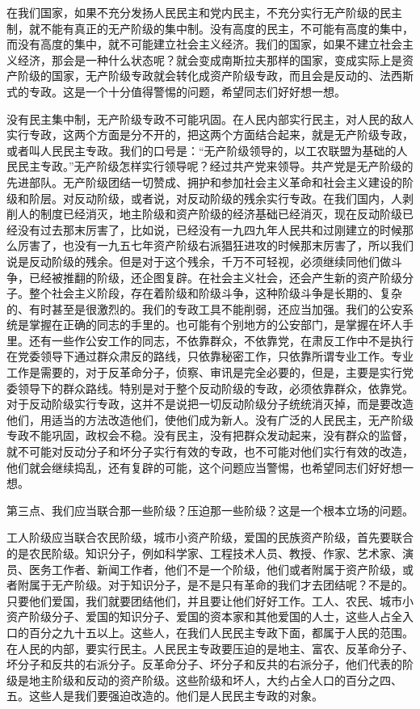 在我们国家，如果不充分发扬人民民主和党内民主，不充分实行无产阶级的民主制，就不能有真正的无产阶级的集中制。没有高度的民主，不可能有高度的集中，而没有高度的集中，就不可能建立社会主义经济。我们的国家，如果不建立社会主义经济，那会是一种什么状态呢？就会变成南斯拉夫那样的国家，变成实际上是资产阶级的国家，无产阶级专政就会转化成资产阶级专政，而且会是反动的、法西斯式的专政。这是一个十分值得警惕的问题，希望同志们好好想一想。

没有民主集中制，无产阶级专政不可能巩固。在人民内部实行民主，对人民的敌人实行专政，这两个方面是分不开的，把这两个方面结合起来，就是无产阶级专政，或者叫人民民主专政。我们的口号是：“无产阶级领导的，以工农联盟为基础的人民民主专政。”无产阶级怎样实行领导呢？经过共产党来领导。共产党是无产阶级的先进部队。无产阶级团结一切赞成、拥护和参加社会主义革命和社会主义建设的阶级和阶层。对反动阶级，或者说，对反动阶级的残余实行专政。在我们国内，人剥削人的制度已经消灭，地主阶级和资产阶级的经济基础已经消灭，现在反动阶级已经没有过去那末厉害了，比如说，已经没有一九四九年人民共和过刚建立的时候那么厉害了，也没有一九五七年资产阶级右派猖狂进攻的时候那末厉害了，所以我们说是反动阶级的残余。但是对于这个残余，千万不可轻视，必须继续同他们做斗争，已经被推翻的阶级，还企图复辟。在社会主义社会，还会产生新的资产阶级分子。整个社会主义阶段，存在着阶级和阶级斗争，这种阶级斗争是长期的、复杂的、有时甚至是很激烈的。我们的专政工具不能削弱，还应当加强。我们的公安系统是掌握在正确的同志的手里的。也可能有个别地方的公安部门，是掌握在坏人手里。还有一些作公安工作的同志，不依靠群众，不依靠党，在肃反工作中不是执行在党委领导下通过群众肃反的路线，只依靠秘密工作，只依靠所谓专业工作。专业工作是需要的，对于反革命分子，侦察、审讯是完全必要的，但是，主要是实行党委领导下的群众路线。特别是对于整个反动阶级的专政，必须依靠群众，依靠党。对于反动阶级实行专政，这并不是说把一切反动阶级分子统统消灭掉，而是要改造他们，用适当的方法改造他们，使他们成为新人。没有广泛的人民民主，无产阶级专政不能巩固，政权会不稳。没有民主，没有把群众发动起来，没有群众的监督，就不可能对反动分子和坏分子实行有效的专政，也不可能对他们实行有效的改造，他们就会继续捣乱，还有复辟的可能，这个问题应当警惕，也希望同志们好好想一想。

第三点、我们应当联合那一些阶级？压迫那一些阶级？这是一个根本立场的问题。

工人阶级应当联合农民阶级，城市小资产阶级，爱国的民族资产阶级，首先要联合的是农民阶级。知识分子，例如科学家、工程技术人员、教授、作家、艺术家、演员、医务工作者、新闻工作者，他们不是一个阶级，他们或者附属于资产阶级，或者附属于无产阶级。对于知识分子，是不是只有革命的我们才去团结呢？不是的。只要他们爱国，我们就要团结他们，并且要让他们好好工作。工人、农民、城市小资产阶级分子、爱国的知识分子、爱国的资本家和其他爱国的人士，这些人占全入口的百分之九十五以上。这些人，在我们人民民主专政下面，都属于人民的范围。在人民的内部，要实行民主。人民民主专政要压迫的是地主、富农、反革命分子、坏分子和反共的右派分子。反革命分子、坏分子和反共的右派分子，他们代表的阶级是地主阶级和反动的资产阶级。这些阶级和坏人，大约占全人口的百分之四、五。这些人是我们要强迫改造的。他们是人民民主专政的对象。

